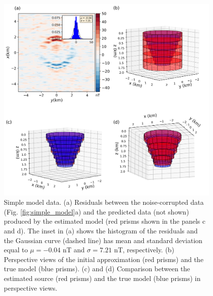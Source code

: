 
\begin{figure}
	\centering
	\includegraphics[width=\linewidth]{figures/simple_results.png}
	\caption{Simple model data. (a) Residuals between the  noise-corrupted data (Fig. \ref{fig:simple_model}a) and the predicted data (not shown) produced by the estimated model (red prisms shown in the panels c and d). The inset in (a) shows the histogram of the residuals and the Gaussian curve (dashed line) has mean and standard deviation equal to $\mu = -0.04$ nT and $\sigma=7.21$ nT, respectively. (b) Perspective views of the initial approximation (red prisms) and the true model (blue prisms). (c) and (d) Comparison between the estimated source (red prisms) and the true model (blue prisms) in perspective views.}
	\label{fig:simple_results}
\end{figure}

